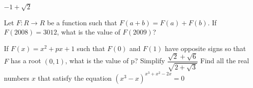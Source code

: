 \documentclass[12pt,addpoints]{exam}
\begin{document}
\begin{questions}
\begin{oneparchoices}
			\choice $-1+\sqrt{2}$
		\end{oneparchoices}
		\question Let $F:R\rightarrow R$ be a function such that $F(a+b)=F(a)+F(b)$. If $F(2008)=3012$, what is the value of $F(2009)$?\\ \begin{oneparchoices}
		\end{oneparchoices}
		\question If $F(x)=x^2+px+1$ such that $F(0)$ and $F(1)$ have opposite signs so that $F$ has a root $(0,1)$, what is the value of p? \vspace{1in}
		\question Simplify $\dfrac{\sqrt{2} +\sqrt{6}}{\sqrt{2+\sqrt{3}}}$\vspace{1in}
		\question Find all the real numbers $x$ that satisfy the equation $(x^3-x)^{x^3+x^2-2x}=0$
	\end{questions}	
\end{document}
